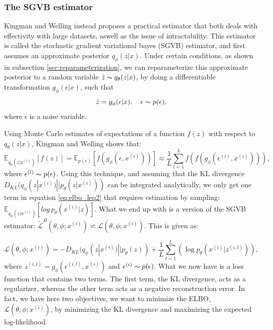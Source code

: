 \subsubsection*{The SGVB estimator}
Kingman and Welling \cite{VAE} instead proposes a practical estimator that both deals with effectivity with large datasets, aswell as the 
issue of intractability. This estimator is called the stochastic gradient variational bayes (SGVB) estimator, and first assumes an approximate 
posterior $q_{\phi}(z|x)$. Under certain conditions, as shown in subsection \ref{sec:reparameterization}, we can reparameterize this approximate
posterior to a random variable $\tilde{z} \thicksim q_{\theta}(z|x)$, by doing a differentiable transformation $g_{\phi}(\epsilon|x)$, such that 
\begin{equation*}
    \tilde{z} = g_{\phi}(\epsilon|x), \quad \epsilon \thicksim p(\epsilon),
\end{equation*}
where $\epsilon$ is a noise variable.\par 
Using Monte Carlo estimates of expectations of a function $f(z)$ with respect to $q_{\theta}(z|x)$, Kingman and Welling \cite{VAE} shows that:
\begin{equation}
    \mathbb{E}_{q_{\theta}(z|x^{(i)})}[f(z)] = \mathbb{E}_{p(\epsilon)}[f(g_{\phi}(\epsilon, x^{(i)}))] \approx \frac{1}{L}\sum_{l=1}^{L}f(f(g_{\phi}(\epsilon^{(l)}, x^{(i)}))),
\end{equation}
where $\epsilon^{(l)} \thicksim p(\epsilon)$. Using this technique, and assuming that the KL divergence 
$D_{KL}(q_{\phi}(z|x^{(i)})||p_{\theta}(z|x^{(i)}))$ can be integrated analytically, we only get one term in 
equation \ref{eq:elbo_leq2} that requires estimation by sampling: $\mathbb{E}_{q_{\phi}(z|x^{(i)})}[log\, p_{\theta}(x^{(i)}|z)]$. 
What we end up with is a version of the SGVB estimator: $\tilde{\mathcal{L}}^{B}(\theta, \phi; x^{(i)}) \backsimeq 
\mathcal{L}(\theta, \phi; x^{(i)})$. This is given as:

\begin{equation}
    \mathcal{L}(\theta, \phi; x^{(i)}) = -D_{KL}(q_{\phi}(z|x^{(i)})||p_{\theta}(z)) + \frac{1}{L}\sum_{l=1}^{L} (\log p_{\theta}(x^{(i)}|z^{(i,l)})),
\end{equation}
where $z^{(i,l)} = g_{\phi}(\epsilon^{(i,l)}, x^{(i)})$ and $\epsilon^{(i)} \thicksim p(\epsilon)$. What we now have is a loss function that contains two terms. 
The first term, the KL divergence, acts as a regularizer, whereas the other term acts as a negative reconstruction error. In fact, we have here two objectives, 
we want to minimize the ELBO, $\mathcal{L}(\theta, \phi; x^{(i)})$, by minimizing the KL divergence and maximizing the expected log-likelihood. 

